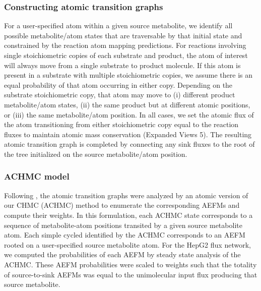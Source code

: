 \documentclass[12pt]{article}
\begin{document}
\subsubsection*{Constructing atomic transition graphs}

For a user-specified atom within a given source metabolite, we identify
all possible metabolite/atom states that are traversable by that initial
state and constrained by the reaction atom mapping predictions. For
reactions involving single stoichiometric copies of each substrate and
product, the atom of interest will always move from a single substrate to
product molecule. If this atom is present in a substrate with multiple
stoichiometric copies, we assume there is an equal probability of that
atom occurring in either copy. Depending on the substrate stoichiometric
copy, that atom may move to (i) different product metabolite/atom states,
(ii) the same product but at different atomic positions, or (iii) the same
metabolite/atom position. In all cases, we set the atomic flux of the atom
transitioning from either stoichiometric copy equal to the reaction fluxes
to maintain atomic mass conservation (Expanded Views 5). The resulting
atomic transition graph is completed by connecting any sink fluxes to the
root of the tree initialized on the source metabolite/atom position. 



\subsubsection*{ACHMC model}

Following \citeauthor{ChitpinJustinG2023AMct}, the atomic transition
graphs were analyzed by an atomic version of our CHMC (ACHMC) method to
enumerate the corresponding AEFMs and compute their weights. In this
formulation, each ACHMC state corresponds to a sequence of metabolite-atom
positions transited by a given source metabolite atom. Each simple cycled
identified by the ACHMC corresponds to an AEFM rooted on a user-specified
source metabolite atom. For the HepG2 flux network, we computed the
probabilities of each AEFM by steady state analysis of the ACHMC. These
AEFM probabilities were scaled to weights such that the totality of
source-to-sink AEFMs was equal to the unimolecular input flux producing
that source metabolite.
\end{document}
